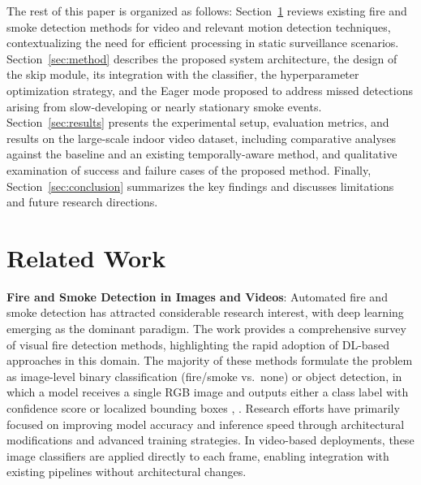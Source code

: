 \documentclass[
  10pt,
]{article}
\begin{document}
The rest of this paper is organized as follows:
Section~\ref{sec:relatedWork} reviews existing fire and smoke detection
methods for video and relevant motion detection techniques,
contextualizing the need for efficient processing in static surveillance
scenarios. Section~\ref{sec:method} describes the proposed system
architecture, the design of the skip module, its integration with the
classifier, the hyperparameter optimization strategy, and the Eager mode
proposed to address missed detections arising from slow-developing or
nearly stationary smoke events. Section~\ref{sec:results} presents the
experimental setup, evaluation metrics, and results on the large-scale
indoor video dataset, including comparative analyses against the
baseline and an existing temporally-aware method, and qualitative
examination of success and failure cases of the proposed method.
Finally, Section~\ref{sec:conclusion} summarizes the key findings and
discusses limitations and future research directions.

\section{Related Work}\label{sec:relatedWork}

\textbf{Fire and Smoke Detection in Images and Videos}: Automated fire
and smoke detection has attracted considerable research interest, with
deep learning emerging as the dominant paradigm. The work
 provides a comprehensive survey
of visual fire detection methods, highlighting the rapid adoption of
DL-based approaches in this domain. The majority of these methods
formulate the problem as image-level binary classification (fire/smoke
vs.~none) or object detection, in which a model receives a single RGB
image and outputs either a class label with confidence score or
localized bounding boxes ,
. Research efforts have
primarily focused on improving model accuracy and inference speed
through architectural modifications and advanced training strategies. In
video-based deployments, these image classifiers are applied directly to
each frame, enabling integration with existing pipelines without
architectural changes.
\end{document}
